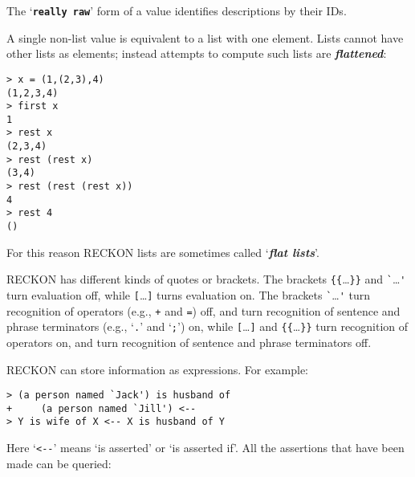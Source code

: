 \documentclass[12pt]{article}
\newcommand{\TT}[1]{{\tt \bfseries #1}}
\newcommand{\key}[1]{{\bf \em #1}\index{#1}}
\newcommand{\skey}[2]{{\bf \em #1#2}\index{#1}}
\newenvironment{indpar}[1][0.3in]%
	{\begin{list}{}%
		     {\setlength{\itemsep}{0in}%
		      \setlength{\topsep}{0in}%
		      \setlength{\parsep}{1ex}%
		      \setlength{\labelwidth}{#1}%
		      \setlength{\leftmargin}{#1}%
		      \addtolength{\leftmargin}{\labelsep}}%
	 \item}%
	{\end{list}}
\begin{document}
The `\TT{really raw}' form of a value identifies descriptions by their IDs.

A single non-list value is equivalent to a list with one element.
Lists cannot have other lists as elements; instead attempts to
compute such lists are \key{flattened}:

\begin{indpar}
\verb|> x = (1,(2,3),4)| \\
\verb|(1,2,3,4)| \\
\verb|> first x| \\
\verb|1| \\
\verb|> rest x| \\
\verb|(2,3,4)| \\
\verb|> rest (rest x)| \\
\verb|(3,4)| \\
\verb|> rest (rest (rest x))| \\
\verb|4| \\
\verb|> rest 4| \\
\verb|()|
\end{indpar}

For this reason RECKON lists are sometimes called `\skey{flat list}s'.

RECKON has different kinds of quotes or brackets.  The brackets
\verb|{{|\ldots\verb|}}| and \verb|`|\ldots\verb|'|
turn
evaluation off, while \verb|[|\ldots\verb|]| turns evaluation on.
The brackets \verb|`|\ldots\verb|'| turn
recognition of operators (e.g., \verb|+| and \verb|=|) off, and turn
recognition of sentence and phrase terminators
(e.g., `\verb|.|' and `\verb|;|') on,
while \verb|[|\ldots\verb|]| and \verb|{{|\ldots\verb|}}|
turn recognition of operators on, and turn recognition of
sentence and phrase terminators off.

RECKON can store information as expressions.  For example:

\begin{indpar}
\verb|> (a person named `Jack') is husband of| \\
\verb|+     (a person named `Jill') <--| \\
\verb|> Y is wife of X <-- X is husband of Y|
\end{indpar}

Here `\verb|<--|' means `is asserted' or `is asserted if'.
All the assertions that have been made can be queried:
\end{document}
